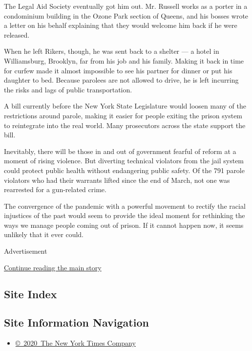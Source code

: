 The Legal Aid Society eventually got him out. Mr. Russell works as a
porter in a condominium building in the Ozone Park section of Queens,
and his bosses wrote a letter on his behalf explaining that they would
welcome him back if he were released.

When he left Rikers, though, he was sent back to a shelter --- a hotel
in Williamsburg, Brooklyn, far from his job and his family. Making it
back in time for curfew made it almost impossible to see his partner for
dinner or put his daughter to bed. Because parolees are not allowed to
drive, he is left incurring the risks and lags of public transportation.

A bill currently before the New York State Legislature would loosen many
of the restrictions around parole, making it easier for people exiting
the prison system to reintegrate into the real world. Many prosecutors
across the state support the bill.

Inevitably, there will be those in and out of government fearful of
reform at a moment of rising violence. But diverting technical violators
from the jail system could protect public health without endangering
public safety. Of the 791 parole violators who had their warrants lifted
since the end of March, not one was rearrested for a gun-related crime.

The convergence of the pandemic with a powerful movement to rectify the
racial injustices of the past would seem to provide the ideal moment for
rethinking the ways we manage people coming out of prison. If it cannot
happen now, it seems unlikely that it ever could.

Advertisement

\protect\hyperlink{after-bottom}{Continue reading the main story}

\hypertarget{site-index}{%
\subsection{Site Index}\label{site-index}}

\hypertarget{site-information-navigation}{%
\subsection{Site Information
Navigation}\label{site-information-navigation}}

\begin{itemize}
\tightlist
\item
  \href{https://help.nytimes.com/hc/en-us/articles/115014792127-Copyright-notice}{©~2020~The
  New York Times Company}
\end{itemize}

